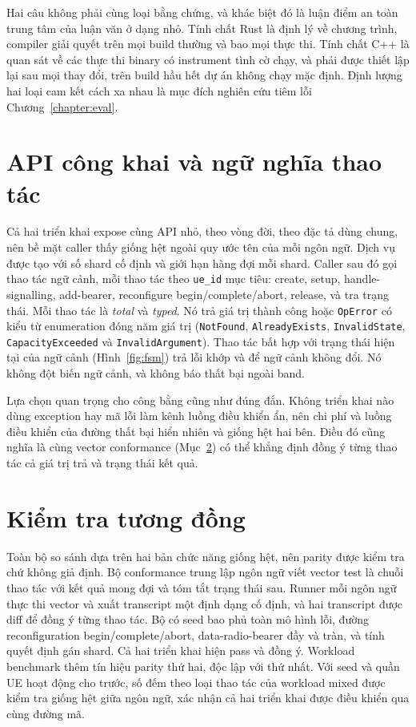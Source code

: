 Hai câu không phải cùng loại bằng chứng, và khác biệt đó là
luận điểm an toàn trung tâm của luận văn ở dạng nhỏ. Tính chất Rust là định lý về chương trình,
compiler giải quyết trên mọi build thường và bao mọi thực thi. Tính chất C++
là quan sát về các thực thi binary có instrument tình cờ chạy,
và phải được thiết lập lại sau mọi thay đổi, trên build hầu hết dự án không
chạy mặc định. Định lượng hai loại cam kết cách xa nhau là
mục đích nghiên cứu tiêm lỗi Chương~\ref{chapter:eval}.

\section{API công khai và ngữ nghĩa thao tác}
Cả hai triển khai expose cùng API nhỏ, theo vòng đời, theo đặc tả dùng chung,
nên bề mặt caller thấy giống hệt ngoài quy ước tên của mỗi ngôn ngữ.
Dịch vụ được tạo với số shard cố định và giới hạn hàng đợi mỗi shard.
Caller sau đó gọi thao tác ngữ cảnh, mỗi thao tác theo \texttt{ue\_id} mục tiêu: create,
setup, handle-signalling, add-bearer, reconfigure begin/complete/abort, release, và tra
trạng thái. Mỗi thao tác là \emph{total} và \emph{typed}. Nó trả giá trị thành công hoặc
\texttt{OpError} có kiểu từ enumeration đóng năm giá trị (\texttt{NotFound},
\texttt{AlreadyExists}, \texttt{InvalidState}, \texttt{CapacityExceeded} và
\texttt{InvalidArgument}). Thao tác bất hợp với trạng thái hiện tại của ngữ cảnh (Hình~\ref{fig:fsm}) trả lỗi khớp và để ngữ cảnh
không đổi. Nó không đột biến ngữ cảnh, và không báo thất bại ngoài band.

Lựa chọn quan trọng cho công bằng cũng như đúng đắn. Không triển khai nào dùng
exception hay mã lỗi làm kênh luồng điều khiển ẩn, nên chi phí và luồng điều khiển của
đường thất bại hiển nhiên và giống hệt hai bên. Điều đó cũng nghĩa là cùng vector conformance
(Mục~\ref{sec:parity}) có thể khẳng định đồng ý từng thao tác cả giá trị trả và
trạng thái kết quả.

\section{Kiểm tra tương đồng}
\label{sec:parity}
Toàn bộ so sánh dựa trên hai bản chức năng giống hệt, nên parity
được kiểm tra chứ không giả định. Bộ conformance trung lập ngôn ngữ viết vector test là
chuỗi thao tác với kết quả mong đợi và tóm tắt trạng thái sau. Runner
mỗi ngôn ngữ thực thi vector và xuất transcript một định dạng cố định, và
hai transcript được diff để đồng ý từng thao tác. Bộ có seed bao phủ toàn mô hình lỗi,
đường reconfiguration begin/complete/abort, data-radio-bearer đầy và tràn, và
tính quyết định gán shard. Cả hai triển khai hiện pass và đồng ý. Workload benchmark
thêm tín hiệu parity thứ hai, độc lập với thứ nhất. Với seed và quần UE hoạt động cho trước,
số đếm theo loại thao tác của workload mixed được kiểm tra giống hệt giữa
ngôn ngữ, xác nhận cả hai triển khai được điều khiển qua cùng đường mã.

